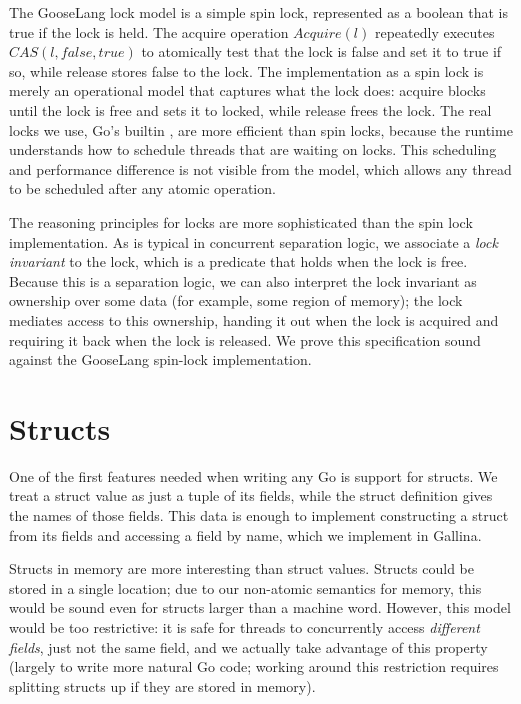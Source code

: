 The GooseLang lock model is a simple spin lock, represented as a boolean
that is true if the lock is held. The acquire operation $Acquire(l)$
repeatedly executes $CAS(l, false, true)$ to atomically test that the
lock is false and set it to true if so, while release stores false to
the lock. The implementation as a spin lock is merely an operational
model that captures what the lock does: acquire blocks until the lock is
free and sets it to locked, while release frees the lock. The real locks
we use, Go's builtin , are more efficient than spin
locks, because the runtime understands how to schedule threads that are
waiting on locks. This scheduling and performance difference is not
visible from the model, which allows any thread to be scheduled after
any atomic operation.

The reasoning principles for locks are more sophisticated than the spin
lock implementation. As is typical in concurrent separation logic, we
associate a \emph{lock invariant} to the lock, which is a predicate that
holds when the lock is free. Because this is a separation logic, we can
also interpret the lock invariant as ownership over some data (for
example, some region of memory); the lock mediates access to this
ownership, handing it out when the lock is acquired and requiring it
back when the lock is released. We prove this specification sound
against the GooseLang spin-lock implementation.

\section{Structs}

One of the first features needed when writing any Go is support for
structs. We treat a struct value as just a tuple of its fields, while
the struct definition gives the names of those fields. This data is
enough to implement constructing a struct from its fields and accessing
a field by name, which we implement in Gallina.

Structs in memory are more interesting than struct values. Structs could
be stored in a single location; due to our non-atomic semantics for
memory, this would be sound even for structs larger than a machine word.
However, this model would be too restrictive: it is safe for threads to
concurrently access \emph{different fields}, just not the same field,
and we actually take advantage of this property (largely to write more
natural Go code; working around this restriction requires splitting
structs up if they are stored in memory).

